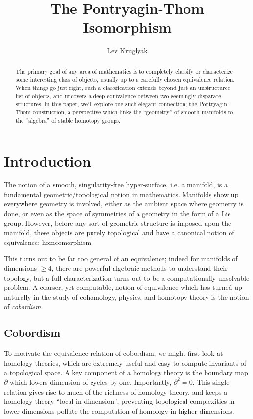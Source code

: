 \documentclass{article}
\title{\textbf{The Pontryagin-Thom Isomorphism}}
\date{}
\author{Lev Kruglyak}
\begin{document}
\maketitle
\begin{abstract}
The primary goal of any area of mathematics is to completely classify or characterize some interesting class of objects, usually up to a carefully chosen equivalence relation. When things go just right, such a classification extends beyond just an unstructured list of objects, and uncovers a deep equivalence between two seemingly disparate structures. In this paper, we'll explore one such elegant connection; the Pontryagin-Thom construction, a perspective which links the ``geometry'' of smooth manifolds to the ``algebra'' of stable homotopy groups.
\end{abstract}
\tableofcontents
\medskip

\section{Introduction}
The notion of a smooth, singularity-free hyper-surface, i.e. a manifold, is a fundamental geometric/topological notion in mathematics. Manifolds show up everywhere geometry is involved, either as the ambient space where geometry is done, or even as the space of symmetries of a geometry in the form of a Lie group. However, before any sort of geometric structure is imposed upon the manifold, these objects are purely topological and have a canonical notion of equivalence: homeomorphism. 

This turns out to be far too general of an equivalence; indeed for manifolds of dimensions $\geq 4$, there are powerful algebraic methods to understand their topology, but a full characterization turns out to be a computationally unsolvable problem. A coarser, yet computable, notion of equivalence which has turned up naturally in the study of cohomology, physics, and homotopy theory is the notion of \emph{cobordism}.

\subsection{Cobordism}
To motivate the equivalence relation of cobordism, we might first look at homology theories, which are extremely useful and easy to compute invariants of a topological space. A key component of a homology theory is the boundary map $\partial$ which lowers dimension of cycles by one. Importantly, $\partial^2=0$. This single relation gives rise to much of the richness of homology theory, and keeps a homology theory ``local in dimension'', preventing topological complexities in lower dimensions pollute the computation of homology in higher dimensions.
\end{document}
